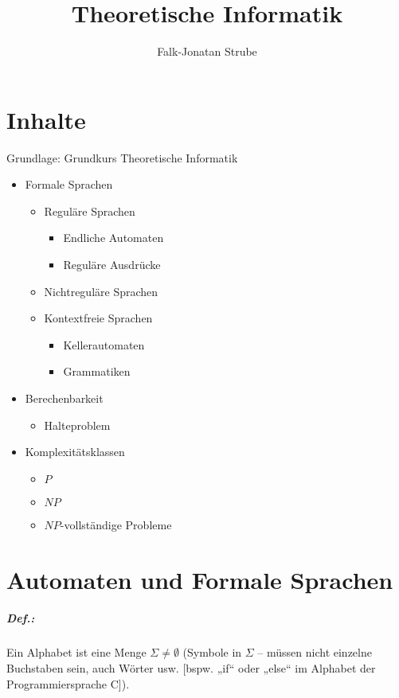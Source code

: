 \documentclass{scrreprt}
\title{Theoretische Informatik}
\author{Falk-Jonatan Strube}
\begin{document}
\maketitle
\tableofcontents

\chapter*{Inhalte}
Grundlage: Grundkurs Theoretische Informatik
\begin{itemize}
\item Formale Sprachen
\begin{itemize}
\item Reguläre Sprachen
\begin{itemize}
\item Endliche Automaten
\item Reguläre Ausdrücke
\end{itemize}
\item Nichtreguläre Sprachen
\item Kontextfreie Sprachen
\begin{itemize}
\item Kellerautomaten
\item Grammatiken
\end{itemize}
\end{itemize}
\item Berechenbarkeit
\begin{itemize}
\item Halteproblem
\end{itemize}
\item Komplexitätsklassen
\begin{itemize}
\item $P$
\item $NP$
\item $NP$-vollständige Probleme
\end{itemize}
\end{itemize}

\chapter{Automaten und Formale Sprachen}
\paragraph{Def.:} Ein Alphabet ist eine Menge $\Sigma \not = \emptyset$ (Symbole in $\Sigma$ -- müssen nicht einzelne Buchstaben sein, auch Wörter usw. [bspw. „if“ oder „else“ im Alphabet der Programmiersprache C]).
\end{document}
